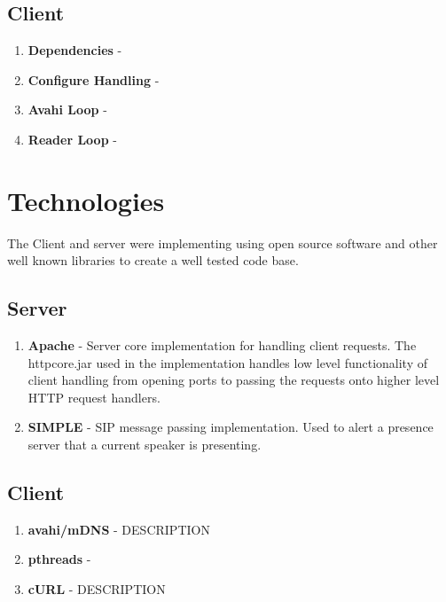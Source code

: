 \documentclass{article}
\begin{document}
	\subsection{Client}
	
		\begin{enumerate}
		
			\item	 { \bf Dependencies } -
			
				
			\item	 { \bf Configure Handling } -
				
			\item	 { \bf Avahi Loop } -
				
			\item	 { \bf  Reader Loop }- 
		
		\end{enumerate}


\section{Technologies}
	The Client and server were implementing using open source software and other well known libraries to create a well tested code base.
	\subsection{Server}
	
		\begin{enumerate}
		\item	{\bf Apache } -
		Server core implementation for handling client requests. The httpcore.jar used in the implementation
		 handles low level functionality of client handling from opening ports to passing the requests onto higher level HTTP request handlers.
			
	
		\item { \bf SIMPLE } - 
		SIP message passing implementation. Used to alert a presence server that a current speaker is presenting.
		
		
		
		\end{enumerate}

		

	\subsection{Client}
	
		\begin{enumerate}
		\item  { \bf avahi/mDNS } -
		DESCRIPTION
		\item  { \bf pthreads } -

		\item  { \bf cURL } -
		DESCRIPTION
		\end{enumerate}
\end{document}
